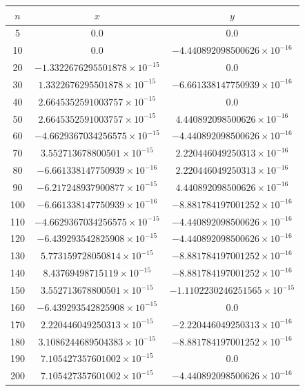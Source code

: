 \documentclass[12pt,a4paper]{article}
\begin{document}
\begin{table}[htbp]
    \centering
    \begin{tabular}{| c | c | c |}
    \hline
    {$n$} & {$x$} & {$y$} \\
    \hline
    5 & $0.0$ & $0.0$ \\
    10 & $0.0$ & $-4.440892098500626 \times 10^{-16}$ \\
    20 & $-1.3322676295501878 \times 10^{-15}$ & $0.0$ \\
    30 & $1.3322676295501878 \times 10^{-15}$ & $-6.661338147750939 \times 10^{-16}$ \\
    40 & $2.6645352591003757 \times 10^{-15}$ & $0.0$ \\
    50 & $2.6645352591003757 \times 10^{-15}$ & $4.440892098500626 \times 10^{-16}$ \\
    60 & $-4.6629367034256575 \times 10^{-15}$ & $-4.440892098500626 \times 10^{-16}$ \\
    70 & $3.552713678800501 \times 10^{-15}$ & $2.220446049250313 \times 10^{-16}$ \\
    80 & $-6.661338147750939 \times 10^{-16}$ & $2.220446049250313 \times 10^{-16}$ \\
    90 & $-6.217248937900877 \times 10^{-15}$ & $4.440892098500626 \times 10^{-16}$ \\
    100 & $-6.661338147750939 \times 10^{-16}$ & $-8.881784197001252 \times 10^{-16}$ \\
    110 & $-4.6629367034256575 \times 10^{-15}$ & $-4.440892098500626 \times 10^{-16}$ \\
    120 & $-6.439293542825908 \times 10^{-15}$ & $-4.440892098500626 \times 10^{-16}$ \\
    130 & $5.773159728050814 \times 10^{-15}$ & $-8.881784197001252 \times 10^{-16}$ \\
    140 & $8.43769498715119 \times 10^{-15}$ & $-8.881784197001252 \times 10^{-16}$ \\
    150 & $3.552713678800501 \times 10^{-15}$ & $-1.1102230246251565 \times 10^{-15}$ \\
    160 & $-6.439293542825908 \times 10^{-15}$ & $0.0$ \\
    170 & $2.220446049250313 \times 10^{-15}$ & $-2.220446049250313 \times 10^{-16}$ \\
    180 & $3.1086244689504383 \times 10^{-15}$ & $-8.881784197001252 \times 10^{-16}$ \\
    190 & $7.105427357601002 \times 10^{-15}$ & $0.0$ \\
    200 & $7.105427357601002 \times 10^{-15}$ & $-4.440892098500626 \times 10^{-16}$ \\

\end{tabular}
\end{table}
\end{document}
